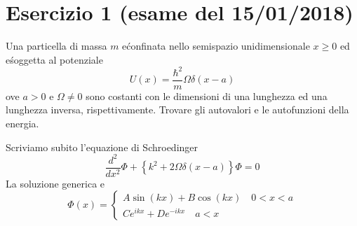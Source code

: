 \documentclass[a4paper]{article}
\begin{document}
    \section*{Esercizio 1 (esame del 15/01/2018)}
        Una particella di massa $m$ e\' confinata nello semispazio unidimensionale $x\geq0$ ed e\' soggetta al potenziale
        \begin{equation*}
            U(x)=\frac{\hbar^2}{m}\Omega\delta(x-a)
        \end{equation*}
        ove $a>0$ e $\Omega\neq0$ sono costanti con le dimensioni di una lunghezza ed una lunghezza inversa, rispettivamente. 
        Trovare gli autovalori e le autofunzioni della energia.
        \begin{figure}[H]
            \centering
        \end{figure}
        Scriviamo subito l'equazione di Schroedinger
        \begin{equation*}
            \frac{d^2}{dx^2}\Phi+\left\{k^2+2\Omega\delta(x-a)\right\}\Phi=0
        \end{equation*}
        La soluzione generica e\'
        \begin{equation*}
            \Phi(x)=
            \begin{cases}
                A\sin(kx)+B\cos(kx)\quad 0<x<a\\
                Ce^{ikx}+De^{-ikx}\quad a<x
            \end{cases}
        \end{equation*}
\end{document}
